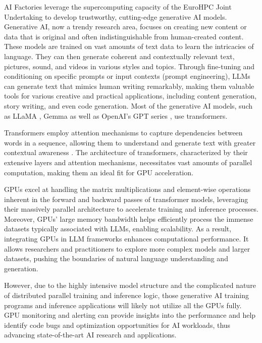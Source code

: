 AI Factories leverage the supercomputing capacity of the EuroHPC Joint Undertaking to develop trustworthy, cutting-edge generative AI models. Generative AI, now a trendy research area, focuses on creating new content or data that is original and often indistinguishable from human-created content. These models are trained on vast amounts of text data to learn the intricacies of language. They can then generate coherent and contextually relevant text, pictures, sound, and videos in various styles and topics. Through fine-tuning and conditioning on specific prompts or input contexts (prompt engineering), LLMs can generate text that mimics human writing remarkably, making them valuable tools for various creative and practical applications, including content generation, story writing, and even code generation. Most of the generative AI models, such as LLaMA \cite{touvron2023llama}, Gemma \cite{gemmateam2024gemma} as well as OpenAI's GPT series \cite{openai2024gpt4}, use transformers. 


Transformers employ attention mechanisms to capture dependencies between words in a sequence, allowing them to understand and generate text with greater contextual awareness \cite{NIPS2017_3f5ee243}. The architecture of transformers, characterized by their extensive layers and attention mechanisms, necessitates vast amounts of parallel computation, making them an ideal fit for GPU acceleration.

GPUs excel at handling the matrix multiplications and element-wise operations inherent in the forward and backward passes of transformer models, leveraging their massively parallel architecture to accelerate training and inference processes. Moreover, GPUs' large memory bandwidth helps efficiently process the immense datasets typically associated with LLMs, enabling scalability. As a result, integrating GPUs in LLM frameworks enhances computational performance. It allows researchers and practitioners to explore more complex models and larger datasets, pushing the boundaries of natural language understanding and generation. 

However, due to the highly intensive model structure and the complicated nature of distributed parallel training and inference logic, those generative AI training programs and inference applications will likely not utilize all the GPUs fully. GPU monitoring and alerting can provide insights into the performance and help identify code bugs and optimization opportunities for AI workloads, thus advancing state-of-the-art AI research and applications.

